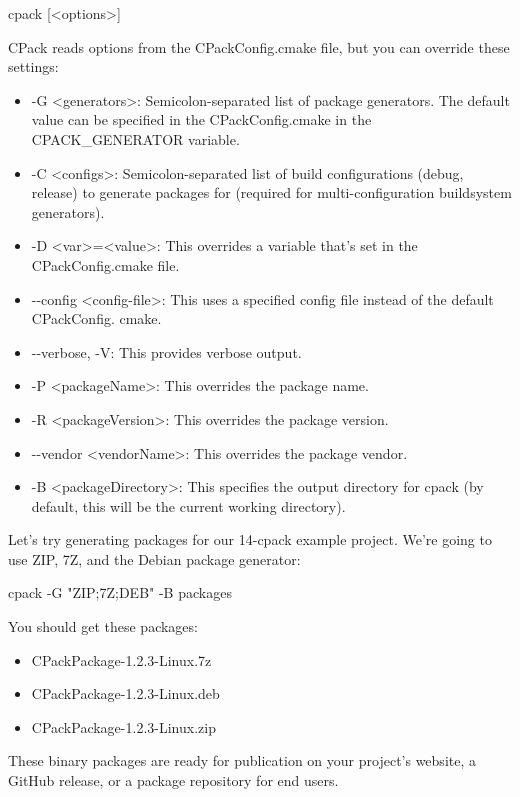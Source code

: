 \begin{shell}
cpack [<options>]
\end{shell}

CPack reads options from the CPackConfig.cmake file, but you can override these settings:

\begin{itemize}
\item
-G <generators>: Semicolon-separated list of package generators. The default value can be specified in the CPackConfig.cmake in the CPACK\_GENERATOR variable.

\item
-C <configs>: Semicolon-separated list of build configurations (debug, release) to generate packages for (required for multi-configuration buildsystem generators).

\item
-D <var>=<value>: This overrides a variable that’s set in the CPackConfig.cmake file.

\item
-{}-config <config-file>: This uses a specified config file instead of the default CPackConfig.
cmake.

\item
-{}-verbose, -V: This provides verbose output.

\item
-P <packageName>: This overrides the package name.

\item
-R <packageVersion>: This overrides the package version.

\item
-{}-vendor <vendorName>: This overrides the package vendor.

\item
 -B <packageDirectory>: This specifies the output directory for cpack (by default, this will be the current working directory).
\end{itemize}

Let’s try generating packages for our 14-cpack example project. We’re going to use ZIP, 7Z, and the Debian package generator:

\begin{shell}
cpack -G "ZIP;7Z;DEB" -B packages
\end{shell}

You should get these packages:

\begin{itemize}
\item
CPackPackage-1.2.3-Linux.7z

\item
CPackPackage-1.2.3-Linux.deb

\item
CPackPackage-1.2.3-Linux.zip
\end{itemize}

These binary packages are ready for publication on your project’s website, a GitHub release, or a package repository for end users.
